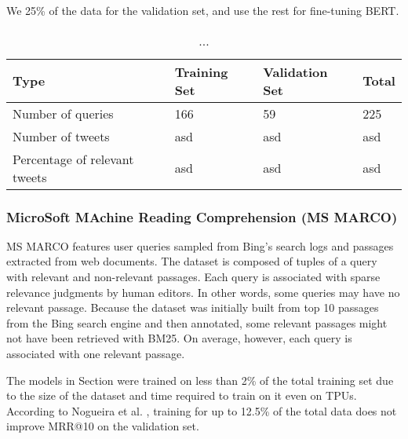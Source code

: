 We  25\% of the data for the validation set, and use the rest for fine-tuning BERT.

\begin{table}[t]
\vspace{0.2cm}
\centering
\begin{tabular}{llll}
\toprule
\textbf{Type} \mbox{\hspace{0.5cm}} & \textbf{Training Set} \mbox{\hspace{1.0cm}} & \textbf{Validation Set} \mbox{\hspace{1.0cm}} & \textbf{Total} \mbox{\hspace{1.0cm}} \\
\toprule
Number of queries & 166 & 59 & 225 \\
Number  of tweets & asd & asd & asd \\
Percentage of relevant tweets  & asd      & asd & asd   \\
\bottomrule
\end{tabular}
\vspace{0.2cm}
\caption{...}%
\label{tab:mb-stats}
\vspace{-0.6cm}
\end{table}


\subsubsection{MicroSoft MAchine Reading Comprehension (MS MARCO)}

MS MARCO \cite{nguyen2016msmarco} features user queries sampled from Bing’s search logs and passages extracted from web documents.
The dataset is composed of tuples of a query with relevant and non-relevant passages.
Each query is associated with sparse relevance judgments by human editors.
In other words, some queries may have no relevant passage.
Because the dataset was initially built from top 10 passages from the Bing search engine and then annotated, some relevant passages might not have been retrieved with BM25.
On average, however, each query is associated with one relevant passage.

The models in Section  were trained on less than 2\% of the total training set due to the size of the dataset and time required to train on it even on TPUs.
According to Nogueira et al. \cite{nogueira2019passage}, training for up to 12.5\% of the total data does not improve MRR@10 on the validation set.

